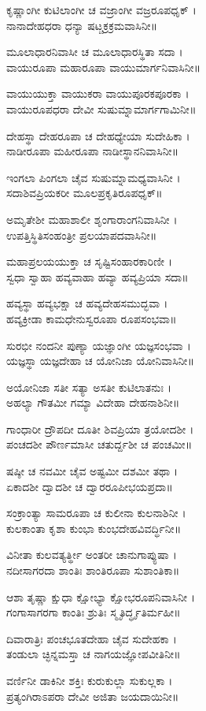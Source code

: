 ಕೃಷ್ಣಾಂಗೀ ಕುಟಿಲಾಂಗೀ ಚ ವಜ್ರಾಂಗೀ ವಜ್ರರೂಪಧೃಕ್ ।\\
ನಾನಾದೇಹಧರಾ ಧನ್ಯಾ ಷಟ್ಚಕ್ರಕ್ರಮವಾಸಿನೀ॥

ಮೂಲಾಧಾರನಿವಾಸೀ ಚ ಮೂಲಾಧಾರಸ್ಥಿತಾ ಸದಾ ।\\
ವಾಯುರೂಪಾ ಮಹಾರೂಪಾ ವಾಯುಮಾರ್ಗನಿವಾಸಿನೀ॥

ವಾಯುಯುಕ್ತಾ ವಾಯುಕರಾ ವಾಯುಪೂರಕಪೂರಕಾ ।\\
ವಾಯುರೂಪಧರಾ ದೇವೀ ಸುಷುಮ್ನಾಮಾರ್ಗಗಾಮಿನೀ॥

ದೇಹಸ್ಥಾ ದೇಹರೂಪಾ ಚ ದೇಹಧ್ಯೇಯಾ ಸುದೇಹಿಕಾ ।\\
ನಾಡೀರೂಪಾ ಮಹೀರೂಪಾ ನಾಡೀಸ್ಥಾನನಿವಾಸಿನೀ॥

ಇಂಗಲಾ ಪಿಂಗಲಾ ಚೈವ ಸುಷುಮ್ನಾಮಧ್ಯವಾಸಿನೀ ।\\
ಸದಾಶಿವಪ್ರಿಯಕರೀ ಮೂಲಪ್ರಕೃತಿರೂಪಧೃಕ್॥

ಅಮೃತೇಶೀ ಮಹಾಶಾಲೀ ಶೃಂಗಾರಾಂಗನಿವಾಸಿನೀ ।\\
ಉಪತ್ತಿಸ್ಥಿತಿಸಂಹಂತ್ರೀ ಪ್ರಲಯಾಪದವಾಸಿನೀ॥

ಮಹಾಪ್ರಲಯಯುಕ್ತಾ ಚ ಸೃಷ್ಟಿಸಂಹಾರಕಾರಿಣೀ ।\\
ಸ್ವಧಾ ಸ್ವಾಹಾ ಹವ್ಯವಾಹಾ ಹವ್ಯಾ ಹವ್ಯಪ್ರಿಯಾ ಸದಾ॥

ಹವ್ಯಸ್ಥಾ ಹವ್ಯಭಕ್ಷಾ ಚ ಹವ್ಯದೇಹಸಮುದ್ಭವಾ ।\\
ಹವ್ಯಕ್ರೀಡಾ ಕಾಮಧೇನುಸ್ವರೂಪಾ ರೂಪಸಂಭವಾ॥

ಸುರಭೀ ನಂದನೀ ಪುಣ್ಯಾ ಯಜ್ಞಾಂಗೀ ಯಜ್ಞಸಂಭವಾ ।\\
ಯಜ್ಞಸ್ಥಾ ಯಜ್ಞದೇಹಾ ಚ ಯೋನಿಜಾ ಯೋನಿವಾಸಿನೀ॥

ಅಯೋನಿಜಾ ಸತೀ ಸತ್ಯಾ ಅಸತೀ ಕುಟಿಲಾತನುಃ ।\\
ಅಹಲ್ಯಾ ಗೌತಮೀ ಗಮ್ಯಾ ವಿದೇಹಾ ದೇಹನಾಶಿನೀ॥

ಗಾಂಧಾರೀ ದ್ರೌಪದೀ ದೂತೀ ಶಿವಪ್ರಿಯಾ ತ್ರಯೋದಶೀ ।\\
ಪಂಚದಶೀ ಪೌರ್ಣಮಾಸೀ ಚತುರ್ದ್ದಶೀ ಚ ಪಂಚಮೀ॥

ಷಷ್ಠೀ ಚ ನವಮೀ ಚೈವ ಅಷ್ಟಮೀ ದಶಮೀ ತಥಾ ।\\
ಏಕಾದಶೀ ದ್ವಾದಶೀ ಚ ದ್ವಾರರೂಪೀಭಯಪ್ರದಾ॥

ಸಂಕ್ರಾಂತ್ಯಾ ಸಾಮರೂಪಾ ಚ ಕುಲೀನಾ ಕುಲನಾಶಿನೀ ।\\
ಕುಲಕಾಂತಾ ಕೃಶಾ ಕುಂಭಾ ಕುಂಭದೇಹವಿವರ್ದ್ಧಿನೀ॥

ವಿನೀತಾ ಕುಲವತ್ಯರ್ತ್ಥೀ ಅಂತರೀ ಚಾನುಗಾಪ್ಯುಷಾ ।\\
ನದೀಸಾಗರದಾ ಶಾಂತಿಃ ಶಾಂತಿರೂಪಾ ಸುಶಾಂತಿಕಾ॥

ಆಶಾ ತೃಷ್ಣಾ ಕ್ಷುಧಾ ಕ್ಷೋಭ್ಯಾ ಕ್ಷೋಭರೂಪನಿವಾಸಿನೀ ।\\
ಗಂಗಾಸಾಗರಗಾ ಕಾಂತಿಃ ಶ್ರುತಿಃ ಸ್ಮೃತಿರ್ದ್ಧೃತಿರ್ಮಹೀ॥

ದಿವಾರಾತ್ರಿಃ ಪಂಚಭೂತದೇಹಾ ಚೈವ ಸುದೇಹಕಾ ।\\
ತಂಡುಲಾ ಚ್ಛಿನ್ನಮಸ್ತಾ ಚ ನಾಗಯಜ್ಞೋಪವೀತಿನೀ॥

ವರ್ಣಿನೀ ಡಾಕಿನೀ ಶಕ್ತಿಃ ಕುರುಕುಲ್ಲಾ ಸುಕುಲ್ಲಕಾ ।\\
ಪ್ರತ್ಯಂಗಿರಾಽಪರಾ ದೇವೀ ಅಜಿತಾ ಜಯದಾಯಿನೀ॥

